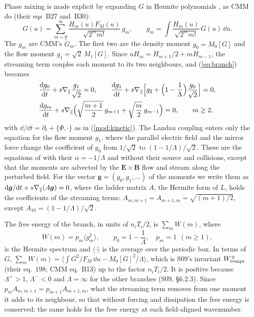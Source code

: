 Phase mixing is made explicit by expanding $G$ in Hermite polynomials \citep{Kanekar2015,Schekochihin2016}, as CMM do (their eqs~B27 and~B30):
\begin{equation}\label{mod:hermiteexp}
  G(u)=\sum_{m=0}^\infty\frac{H_m(u)F_M(u)}{\sqrt{2^mm!}}\,g_m,\qquad
  g_m=\int\frac{H_m(u)}{\sqrt{2^mm!}}\,G(u)\,\dd u .
\end{equation}
The $g_m$ are CMM's $\tilde G_m$. The first two are the density moment $g_0=M_0[G]$ and the flow moment $g_1=\sqrt2\,M_1[G]$. Since $uH_m=H_{m+1}/2+mH_{m-1}$, the streaming term couples each moment to its two neighbours, and (\ref{eq:branch}) becomes
\begin{equation}\label{mod:hierarchy}
\begin{aligned}
  &\frac{\mathrm{d} g_0}{\mathrm{d} t}+s\nabla_\parallel\frac{g_1}{\sqrt2}=0,\qquad
  \frac{\mathrm{d} g_1}{\mathrm{d} t}+s\nabla_\parallel\Big[g_2+\Big(1-\frac1\Lambda\Big)\frac{g_0}{\sqrt2}\Big]=0,\\
  &\frac{\mathrm{d} g_m}{\mathrm{d} t}+s\nabla_\parallel\Big(\sqrt{\frac{m+1}{2}}\,g_{m+1}+\sqrt{\frac m2}\,g_{m-1}\Big)=0,\qquad m\ge2,
\end{aligned}
\end{equation}
with $\dd/\dd t=\partial_t+\{\Phi,\cdot\}$ as in (\ref{mod:kinetic}). The Landau coupling enters only the equation for the flow moment $g_1$, where the parallel electric field and the mirror force change the coefficient of $g_0$ from $1/\sqrt2$ to $(1-1/\Lambda)/\sqrt2$. These are the equations of \citet[eqs~4.3--4.5]{Kanekar2015} with their $\alpha=-1/\Lambda$ and without their source and collisions, except that the moments are advected by the $\boldsymbol E\times\boldsymbol B$ flow and stream along the perturbed field. For the vector $\boldsymbol g=(g_0,g_1,\dots)$ of the moments we write them as $\mathrm{d}\boldsymbol g/\mathrm{d} t+s\nabla_\parallel(A\boldsymbol g)=0$, where the ladder matrix $A$, the Hermite form of $L$, holds the coefficients of the streaming terms: $A_{m,m+1}=A_{m+1,m}=\sqrt{(m+1)/2}$, except $A_{10}=(1-1/\Lambda)/\sqrt2$.

The free energy of the branch, in units of $n_iT_i/2$, is $\sum_mW(m)$, where
\begin{equation}\label{eq:fe}
  W(m)=p_m\langle g_m^2\rangle,\qquad p_0=1-\frac1\Lambda,\quad p_m=1\ \ (m\ge1),
\end{equation}
is the Hermite spectrum and $\langle\cdot\rangle$ is the average over the periodic box. In terms of $G$, $\sum_mW(m)=\langle\int G^2/F_M\,\dd u-M_0[G]^2/\Lambda\rangle$, which is S09's invariant $W^\pm_{\rm compr}$ (their eq.~198; CMM eq.~B13) up to the factor $n_iT_i/2$. It is positive because $\Lambda^+>1$, $\Lambda^-<0$ and $\Lambda=\infty$ for the other branches (S09, \S6.2.3). Since $p_mA_{m,m+1}=p_{m+1}A_{m+1,m}$, what the streaming term removes from one moment it adds to its neighbour, so that without forcing and dissipation the free energy is conserved; the same holds for the free energy at each field-aligned wavenumber.

